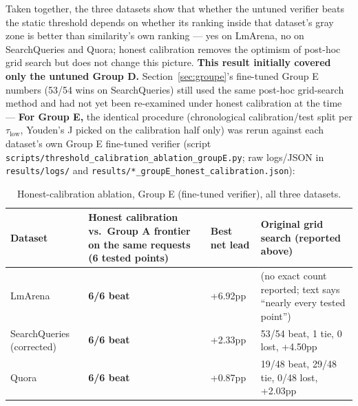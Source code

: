 \documentclass[11pt]{article}
\newcommand{\taulow}{\ensuremath{\tau_{\text{low}}}}
\newenvironment{fittab}{\begin{lrbox}{\fittabbox}}{\end{lrbox}%
  \ifdim\wd\fittabbox>\linewidth\resizebox{\linewidth}{!}{\usebox{\fittabbox}}\else\usebox{\fittabbox}\fi}
\begin{document}
Taken together, the three datasets show that whether the untuned verifier beats the static threshold depends on whether its ranking inside that dataset's gray zone is better than similarity's own ranking --- yes on LmArena, no on SearchQueries and Quora; honest calibration removes the optimism of post-hoc grid search but does not change this picture. \textbf{This result initially covered only the untuned Group D.} Section~\ref{sec:groupe}'s fine-tuned Group E numbers (53/54 wins on SearchQueries) still used the same post-hoc grid-search method and had not yet been re-examined under honest calibration at the time --- \textbf{For Group E,} the identical procedure (chronological calibration/test split per $\taulow$, Youden's J picked on the calibration half only) was rerun against each dataset's own Group E fine-tuned verifier (script \texttt{scripts/\allowbreak{}threshold\_\allowbreak{}calibration\_\allowbreak{}ablation\_\allowbreak{}group\allowbreak{}E.\allowbreak{}py}; raw logs/JSON in \texttt{results/\allowbreak{}logs/\allowbreak{}} and \texttt{results/\allowbreak{}*\_\allowbreak{}group\allowbreak{}E\_\allowbreak{}honest\_\allowbreak{}calibration.\allowbreak{}json}):

\begin{table}[h]
\centering
\small
\begin{fittab}\begin{tabular}{@{}lp{}p{}p{}@{}}
\toprule
\textbf{Dataset} & \textbf{Honest calibration vs.\ Group A frontier on the same requests (6 tested points)} & \textbf{Best net lead} & \textbf{Original grid search (reported above)} \\
\midrule
LmArena & \textbf{6/6 beat} & +6.92pp & (no exact count reported; text says ``nearly every tested point'') \\
SearchQueries (corrected) & \textbf{6/6 beat} & +2.33pp & 53/54 beat, 1 tie, 0 lost, +4.50pp \\
Quora & \textbf{6/6 beat} & +0.87pp & 19/48 beat, 29/48 tie, 0/48 lost, +2.03pp \\
\bottomrule
\end{tabular}\end{fittab}
\caption{Honest-calibration ablation, Group E (fine-tuned verifier), all three datasets.}
\end{table}
\end{document}
